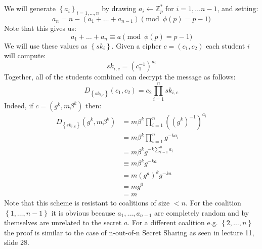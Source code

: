 \documentclass{article}
\begin{document}
\pagebreak



\pagebreak
\section{}%
\subsection{}%
We will generate $\left\{ a_{i}\right\} _{i=1,\ldots,n}$ by drawing
$a_{i}\leftarrow\mathbb{Z}_{p}^{*}$ for $i=1,\ldots n-1$, and setting:
\[
a_{n}=n-(a_{1}+\ldots+a_{n-1})\pmod{\phi(p)=p-1}
\]
Note that this gives us:
\[
a_{1}+\ldots+a_{n}\equiv a\pmod{\phi(p)=p-1}
\]
We will use these values as $\left\{ sk_{i}\right\} $. Given a cipher
$c=\left(c_{1},c_{2}\right)$ each student $i$ will compute:
\[
sk_{i,c}=\left(c_{1}^{-1}\right)^{a_{i}}
\]
Together, all of the students combined can decrypt the message as
follows:
\[
D_{\left\{ sk_{i,c}\right\} }(c_{1},c_{2})=c_{2}\prod_{i=1}^{n}sk_{i,c}
\]
Indeed, if $c=\left(g^{k},m\beta^{k}\right)$ then:
\begin{align*}
D_{\left\{ sk_{i,c}\right\} }\left(g^{k},m\beta^{k}\right) & =m\beta^{k}\prod_{i=1}^{n}\left(\left(g^{k}\right)^{-1}\right)^{a_{i}}\\
 & =m\beta^{k}\prod_{i=1}^{n}g^{-ka_{i}}\\
 & =m\beta^{k}g^{-k\sum_{i=1}^{n}a_{i}}\\
 & \equiv m\beta^{k}g^{-ka}\\
 & =m\left(g^{a}\right)^{k}g^{-ka}\\
 & =mg^{0}\\
 & =m
\end{align*}
Note that this scheme is resistant to coalitions of size $<n$. For
the coalition $\left\{ 1,\ldots,n-1\right\} $ it is obvious because
$a_{1},\ldots,a_{n-1}$ are completely random and by themselves are
unrelated to the secret $a$. For a different coalition e.g. $\left\{ 2,\ldots,n\right\} $
the proof is similar to the case of n-out-of-n Secret Sharing as seen
in lecture 11, slide 28.
\end{document}
